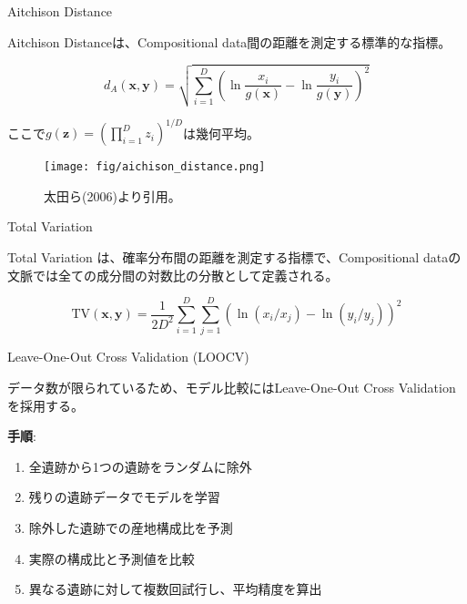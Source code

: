 \documentclass[xelatex, 8pt]{beamer}
\theoremstyle{plain}
\theoremstyle{definition}
\begin{document}
\begin{frame}{Aitchison Distance}

    Aitchison Distance\cite{Aitchison1982-yc}は、Compositional data間の距離を測定する標準的な指標。

    $$d_A(\mathbf{x}, \mathbf{y}) = \sqrt{\sum_{i=1}^{D} \left(\ln\frac{x_i}{g(\mathbf{x})} - \ln\frac{y_i}{g(\mathbf{y})}\right)^2}$$

    ここで$g(\mathbf{z}) = \left(\prod_{i=1}^D z_i\right)^{1/D}$は幾何平均。

    \begin{figure}
        \centering
        \texttt{[image: fig/aichison\_distance.png]}
        \caption{太田ら(2006)\cite{ohta2006}より引用。}
        \label{fig:enter-label}
    \end{figure}

\end{frame}

\begin{frame}{Total Variation}

    Total Variation は、確率分布間の距離を測定する指標で、Compositional dataの文脈では全ての成分間の対数比の分散として定義される。

    $$\text{TV}(\mathbf{x}, \mathbf{y}) = \frac{1}{2D^2}\sum_{i=1}^{D}\sum_{j=1}^{D}(\ln(x_i/x_j) - \ln(y_i/y_j))^2$$

\end{frame}

\begin{frame}{Leave-One-Out Cross Validation (LOOCV)}

    データ数が限られているため、モデル比較にはLeave-One-Out Cross Validationを採用する。

    \vspace{4mm}

    \textbf{手順}:
    \begin{enumerate}
        \item 全遺跡から1つの遺跡をランダムに除外
        \item 残りの遺跡データでモデルを学習
        \item 除外した遺跡での産地構成比を予測
        \item 実際の構成比と予測値を比較
        \item 異なる遺跡に対して複数回試行し、平均精度を算出
    \end{enumerate}

    \vspace{5mm}


\end{frame}
\end{document}
